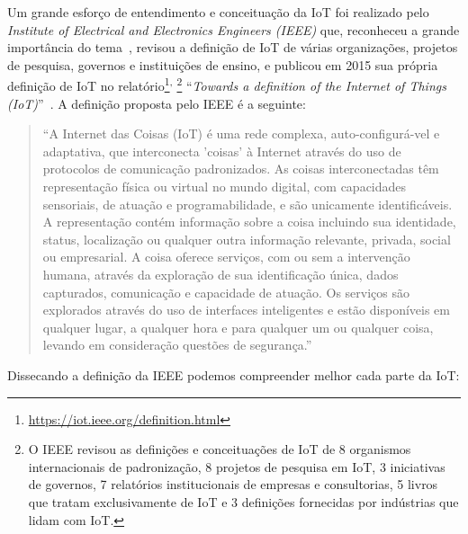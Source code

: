 \documentclass[pdftex, brazil, 12pt, twoside]{article}
\newcommand{\ingles}[1]{\textit{#1}}
\begin{document}
Um grande esforço de entendimento e conceituação da IoT foi realizado pelo \ingles{Institute
  of Electrical and Electronics Engineers (IEEE)} que, reconheceu a grande importância
do tema~\citep{IEEEIoTReport}, revisou a definição de IoT
de várias organizações, projetos de pesquisa, governos e instituições de ensino, e publicou
em 2015 sua própria definição de IoT no
relatório\footnote{\url{https://iot.ieee.org/definition.html}}\textsuperscript{, }\footnote{O IEEE revisou
  as definições e conceituações de IoT de 8 organismos internacionais de padronização, 8 projetos
  de pesquisa em IoT, 3 iniciativas de governos, 7 relatórios institucionais de empresas e
  consultorias, 5 livros que tratam exclusivamente de IoT e 3 definições fornecidas por indústrias
que lidam com IoT.}
``\ingles{Towards a definition of
  the Internet of Things (IoT)}''~\citep{IEEEIoTDefinition}. A definição proposta
pelo IEEE é a seguinte:

\begin{quote}
  ``A Internet das Coisas (IoT) é uma rede complexa, auto-configurá-vel e adaptativa,
  que interconecta 'coisas' à Internet através do uso de protocolos de comunicação
  padronizados. As coisas interconectadas têm representação física ou virtual no mundo
  digital, com capacidades sensoriais, de atuação e programabilidade, e são unicamente
  identificáveis. A representação contém informação sobre a coisa incluindo sua identidade,
  status, localização ou qualquer outra informação relevante, privada, social ou
  empresarial. A coisa oferece serviços, com ou sem a intervenção humana, através
  da exploração de sua identificação única, dados capturados, comunicação e capacidade
  de atuação. Os serviços são explorados através do uso de interfaces inteligentes e
  estão disponíveis em qualquer lugar, a qualquer hora e para qualquer um ou qualquer
  coisa, levando em consideração questões de segurança.''~\citep{IEEEIoTDefinition}
\end{quote}

Dissecando a definição da IEEE podemos compreender melhor cada parte da IoT:
\end{document}
